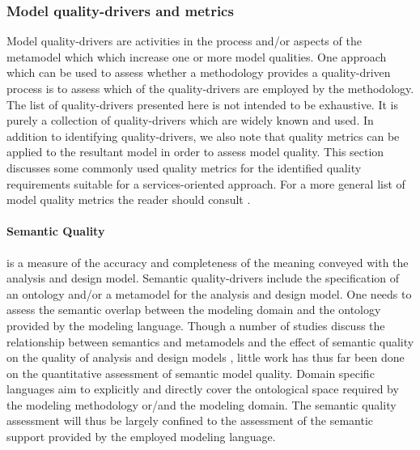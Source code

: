 
\subsubsection{Model quality-drivers and metrics}
\label{sec:modelQualityDriversAndMetrics}

Model quality-drivers are activities in the process and/or aspects of the metamodel which which increase one or more model qualities. One approach which can be used to assess whether a methodology provides a quality-driven process is to assess which of the quality-drivers are employed by the methodology. The list of quality-drivers presented here is not intended to be exhaustive. It is purely a collection of quality-drivers which are widely known and used. In addition to identifying quality-drivers, we also note that quality metrics can be applied to the resultant model in order to assess model quality. This section discusses some commonly used quality metrics for the identified quality requirements suitable for a services-oriented approach. For a more general list of model quality metrics the reader should consult \cite{mohagheghi_existing_2009}.

\paragraph{Semantic Quality} is a measure of the accuracy and completeness of the meaning conveyed with the analysis and design model. Semantic quality-drivers include the specification of an ontology and/or a metamodel for the analysis and design model. One needs to assess the semantic overlap between the modeling domain and the ontology provided by the modeling language. Though a number of studies discuss the relationship between semantics and metamodels \cite{staab_model_2010,veldhuis_tool_2009,henderson-sellers_bridging_2011} and the effect of semantic quality on the quality of analysis and design models \cite{buder_effects_2010,staab_model_2010}, little work has thus far been done on the quantitative assessment of semantic model quality. Domain specific languages aim to explicitly and directly cover the ontological space required by the modeling methodology or/and the modeling domain. The semantic quality assessment will thus be largely confined to the assessment of the semantic support provided by the employed modeling language.

